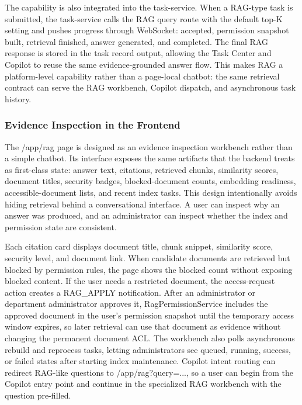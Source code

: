 The capability is also integrated into the task-service. When a RAG-type task is submitted, the task-service calls the RAG query route with the default top-K setting and pushes progress through WebSocket: accepted, permission snapshot built, retrieval finished, answer generated, and completed. The final RAG response is stored in the task record output, allowing the Task Center and Copilot to reuse the same evidence-grounded answer flow. This makes RAG a platform-level capability rather than a page-local chatbot: the same retrieval contract can serve the RAG workbench, Copilot dispatch, and asynchronous task history.

\subsubsection{Evidence Inspection in the Frontend}

The /app/rag page is designed as an evidence inspection workbench rather than a simple chatbot. Its interface exposes the same artifacts that the backend treats as first-class state: answer text, citations, retrieved chunks, similarity scores, document titles, security badges, blocked-document counts, embedding readiness, accessible-document lists, and recent index tasks. This design intentionally avoids hiding retrieval behind a conversational interface. A user can inspect why an answer was produced, and an administrator can inspect whether the index and permission state are consistent.

Each citation card displays document title, chunk snippet, similarity score, security level, and document link. When candidate documents are retrieved but blocked by permission rules, the page shows the blocked count without exposing blocked content. If the user needs a restricted document, the access-request action creates a RAG\_APPLY notification. After an administrator or department administrator approves it, RagPermissionService includes the approved document in the user's permission snapshot until the temporary access window expires, so later retrieval can use that document as evidence without changing the permanent document ACL. The workbench also polls asynchronous rebuild and reprocess tasks, letting administrators see queued, running, success, or failed states after starting index maintenance. Copilot intent routing can redirect RAG-like questions to /app/rag?query=..., so a user can begin from the Copilot entry point and continue in the specialized RAG workbench with the question pre-filled.

